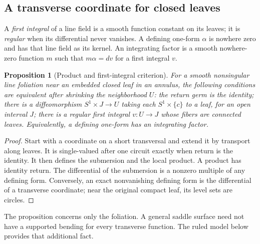 \documentclass[11pt]{amsart}
\newtheorem{proposition}[theorem]{Proposition}
\theoremstyle{definition}
\theoremstyle{remark}
\numberwithin{equation}{section}
\begin{document}
\subsection{A transverse coordinate for closed leaves}
A \emph{first integral} of a line field is a smooth function constant
on its leaves; it is \emph{regular} when its differential never vanishes.
A defining one-form $\alpha$ is nowhere zero and has that line field
as its kernel. An integrating factor is a smooth nowhere-zero function
$m$ such that $m\alpha=dv$ for a first integral $v$.
\begin{proposition}[Product and first-integral criterion]\label{prop:product-holonomy}
For a smooth nonsingular line foliation near an embedded closed leaf in
an annulus, the following conditions are equivalent after shrinking the
neighborhood $U$: the return germ is the identity; there is a
diffeomorphism $S^1\times J\to U$ taking each $S^1\times\{c\}$ to a
leaf, for an open interval $J$; there is a regular first integral
$v:U\to J$ whose fibers are connected leaves. Equivalently, a defining
one-form has an integrating factor.
\end{proposition}
\begin{proof}
Start with a coordinate on a short transversal and extend it by transport
along leaves. It is single-valued after one circuit exactly when return
is the identity. It then defines the submersion and the local product.
A product has identity return. The differential of the submersion is a
nonzero multiple of any defining form. Conversely, an exact nonvanishing
defining form is the differential of a transverse coordinate; near the
original compact leaf, its level sets are circles.
\end{proof}
The proposition concerns only the foliation. A general saddle surface
need not have a supported bending for every transverse function. The
ruled model below provides that additional fact.
\end{document}
